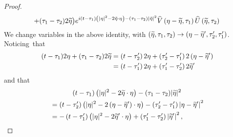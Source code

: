 \documentclass[10pt]{amsart}
\theoremstyle{definition}\newtheorem{defi}[theo]{Definition}\newtheorem{rema}[theo]{Remark}\newtheorem{exam}[theo]{Example}\newtheorem{exem}[theo]{Example}\newtheorem{nota}[theo]{Notation}
\let\oldtilde\tilde
\renewcommand*{\tilde}[1]{\mathchoice{\widetilde{#1}}{\widetilde{#1}}{\oldtilde{#1}}{\oldtilde{#1}}}
\let\oldhat\hat
\renewcommand*{\hat}[1]{\mathchoice{\widehat{#1}}{\widehat{#1}}{\oldhat{#1}}{\oldhat{#1}}}
\begin{document}
\begin{proof}
\begin{multline*}
+ (\tau_1-\tau_2) 2\tilde{\eta}\big) e^{i(t-\tau_1)\left(|\eta|^2-2\tilde{\eta}\cdot \eta\right)-(\tau_1-\tau_2)|\tilde{\eta}|^2 }\hat V\left(\eta-\tilde{\eta},\tau_1\right) \hat U\left(\tilde{\eta},\tau_2\right)
\end{multline*}
We change variables in the above identity, with $(\tilde \eta,\tau_1,\tau_2) \rightarrow (\eta-\tilde \eta',\tau_2',\tau_1')$. Noticing~that
\begin{equation} \label{id:changeofvarinter1}
\begin{split}
(t-\tau_1)2\eta + (\tau_1-\tau_2) 2\tilde{\eta} &=\left(t-\tau_2'\right)2\eta + \left(\tau_2'-\tau_1'\right) 2\left(\eta-\tilde{\eta}'\right)\\
&=\left(t-\tau_1'\right)2\eta + \left(\tau_1'-\tau_2'\right) 2\tilde{\eta}'
\end{split}
\end{equation}
and that
\begin{multline}\label{id:changeofvarinter2}
(t-\tau_1)\left(|\eta|^2-2\tilde{\eta}\cdot \eta\right)-(\tau_1-\tau_2)|\tilde{\eta}|^2\\
\begin{aligned}
&=\left(t-\tau_2'\right)\left(|\eta|^2-2\left(\eta-\tilde{\eta}'\right)\cdot \eta\right)-\left(\tau_2'-\tau_1'\right)\left|\eta-\tilde{\eta}'\right|^2\\
&=-\left(t-\tau_1'\right)\left(|\eta|^2-2\tilde{\eta}'\cdot \eta\right)+\left(\tau_1'-\tau_2'\right)\left|\tilde{\eta}'\right|^2,
\end{aligned}
\end{multline}


\end{proof}
\end{document}
